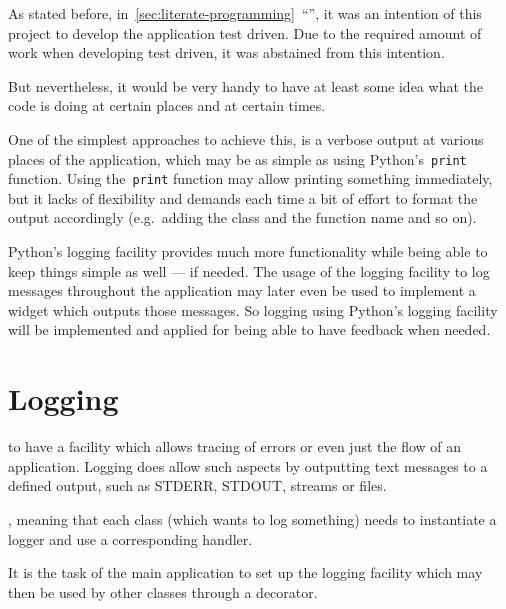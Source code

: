 \documentclass[%
    a4paper,    %
    justified,  %
    nobib,      %
    openany     %
]{tufte-book}
\makeatletter
\renewcommand{\label}[1]{\@tufte@label{##1}}%
\makeatother
\begin{document}
As stated before,
in~\autoref{sec:literate-programming}~\enquote{},
it was an intention of this project to develop the application test driven. Due
to the required amount of work when developing test driven, it was abstained
from this intention.

But nevertheless, it would be very handy to have at least some idea what the
code is doing at certain places and at certain times.

One of the simplest approaches to achieve this, is a verbose output at various
places of the application, which may be as simple as using Python's~\verb=print=
function. Using the~\verb=print= function may allow printing something
immediately, but it lacks of flexibility and demands each time a bit of effort
to format the output accordingly (e.g.\ adding the class and the function name
and so on).

Python's logging facility provides much more functionality while being able to
keep things simple as well --- if needed. The usage of the logging facility to
log messages throughout the application may later even be used to implement a
widget which outputs those messages. So logging using Python's logging facility
will be implemented and applied for being able to have feedback when needed.

\chapter{Logging}
\label{appendix:chap:logging}

 to have a facility which allows tracing of
errors or even just the flow of an application. Logging does allow such aspects
by outputting text messages to a defined output, such as STDERR, STDOUT, streams
or files.

, meaning that each class
(which wants to log something) needs to instantiate a logger and use a
corresponding handler.

 It is the task
of the main application to set up the logging facility which may then be used by
other classes through a decorator.
\end{document}
